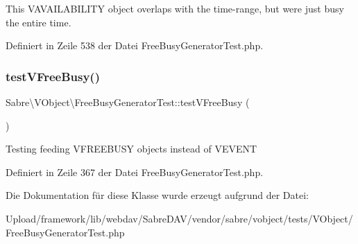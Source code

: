This V\+A\+V\+A\+I\+L\+A\+B\+I\+L\+I\+TY object overlaps with the time-\/range, but we\textquotesingle{}re just busy the entire time. 

Definiert in Zeile 538 der Datei Free\+Busy\+Generator\+Test.\+php.

\mbox{\label{class_sabre_1_1_v_object_1_1_free_busy_generator_test_a7fb0a42e75ee90e32637e9cf987a1827}} 
\subsubsection{\texorpdfstring{test\+V\+Free\+Busy()}{testVFreeBusy()}}
{\footnotesize\ttfamily Sabre\textbackslash{}\+V\+Object\textbackslash{}\+Free\+Busy\+Generator\+Test\+::test\+V\+Free\+Busy (\begin{DoxyParamCaption}{ }\end{DoxyParamCaption})}

Testing feeding V\+F\+R\+E\+E\+B\+U\+SY objects instead of V\+E\+V\+E\+NT 

Definiert in Zeile 367 der Datei Free\+Busy\+Generator\+Test.\+php.



Die Dokumentation für diese Klasse wurde erzeugt aufgrund der Datei\+:\begin{DoxyCompactItemize}
\item 
Upload/framework/lib/webdav/\+Sabre\+D\+A\+V/vendor/sabre/vobject/tests/\+V\+Object/Free\+Busy\+Generator\+Test.\+php\end{DoxyCompactItemize}
